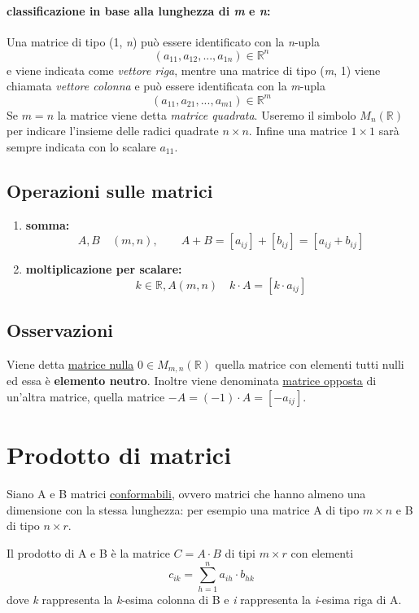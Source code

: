 			\paragraph{classificazione in base alla lunghezza di \textit{m} e \textit{n}:}
			Una matrice di tipo (1, \textit{n}) può essere identificato con la \textit{n}-upla
			$$ (a_{11}, a_{12}, ..., a_{1n}) \in \mathbb{R}^n $$
			e viene indicata come \textit{vettore riga}, mentre una matrice di tipo (\textit{m}, 1) viene chiamata \textit{vettore colonna} e può essere identificata con la \textit{m}-upla
			$$ (a_{11}, a_{21}, ..., a_{m1}) \in \mathbb{R}^m $$
			Se $ m = n $ la matrice viene detta \textit{matrice quadrata}. Useremo il simbolo $ M_{n} (\mathbb{R}) $ per indicare l'insieme delle radici quadrate $ n \times n $. Infine una matrice $ 1 \times 1 $ sarà sempre indicata con lo scalare $ a_{11} $.
			
		\subsection{Operazioni sulle matrici}
			\begin{enumerate}
				\item \textbf{somma:}
				$$ A, B \quad (m, n), \qquad A + B = [a_{ij}] + [b_{ij}] = [a_{ij} + b_{ij}] $$
				\item \textbf{moltiplicazione per scalare:}
				$$ k \in \mathbb{R}, A (m, n) \quad k \cdot A = [k \cdot a_{ij}] $$
			\end{enumerate}
		
		\subsection{Osservazioni}
			Viene detta \underline{matrice nulla} $ 0 \in M_{m, n} (\mathbb{R}) $ quella matrice con elementi tutti nulli ed essa è \textbf{elemento neutro}. Inoltre viene denominata \underline{matrice opposta} di un'altra matrice, quella matrice $ -A = (-1) \cdot A = [-a_{ij}] $.
	
	\section{Prodotto di matrici}
		Siano A e B matrici \underline{conformabili}, ovvero matrici che hanno almeno una dimensione con la stessa lunghezza: per esempio una matrice A di tipo $ m \times n $ e B di tipo $ n \times r $.
		
		Il prodotto di A e B è la matrice $ C = A \cdot B $ di tipi $ m \times r $ con elementi
		$$ c_{ik} = \sum_{h=1}^n a_{ih} \cdot b_{hk} $$
		dove \textit{k} rappresenta la \textit{k}-esima colonna di B e \textit{i} rappresenta la \textit{i}-esima riga di A.
		
